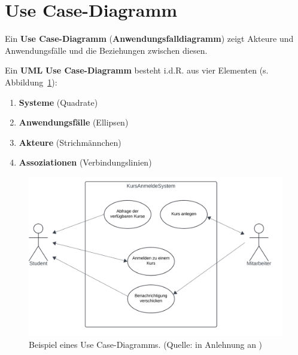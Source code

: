 \section{Use Case-Diagramm}

\begin{tcolorbox}
    Ein \textbf{Use Case-Diagramm} (\textbf{Anwendungsfalldiagramm}) zeigt Akteure und Anwendungsfälle und die Beziehungen zwischen diesen.
\end{tcolorbox}

\noindent
Ein \textbf{UML} \textbf{Use Case-Diagramm} besteht i.d.R. aus vier Elementen (s. Abbildung~\ref{fig:usecasediagram}):

\begin{enumerate}
    \item \textbf{Systeme} (Quadrate)
    \item \textbf{Anwendungsfälle} (Ellipsen)
    \item \textbf{Akteure} (Strichmännchen)
    \item \textbf{Assoziationen} (Verbindungslinien)
\end{enumerate}


\begin{figure}
    \centering
    \includegraphics[scale=0.4]{chapters/Anhang/CheatSheets/img/usecasediagram}
    \caption{Beispiel eines Use Case-Diagramms. (Quelle: in Anlehnung an \cite[Figure A-1]{Mar03})}
    \label{fig:usecasediagram}
\end{figure}